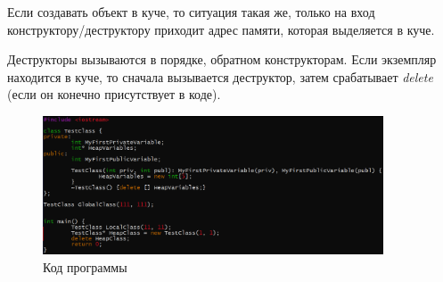 \documentclass[a4paper,12pt]{article}
\begin{document}
Если создавать объект в куче, то ситуация такая же, только на вход конструктору/деструктору приходит адрес памяти, которая выделяется в куче.

Деструкторы вызываются в порядке, обратном конструкторам. Если экземпляр находится в куче, то сначала вызывается деструктор, затем срабатывает \textit{delete} (если он конечно присутствует в коде).
\begin{figure}[H]\label{fig: Конструктор деструктор код}
    \centering
    \includegraphics[width = 0.9\textwidth]{Конструктор деструктор код.png}
    \caption{Код программы}
\end{figure}
\end{document}

